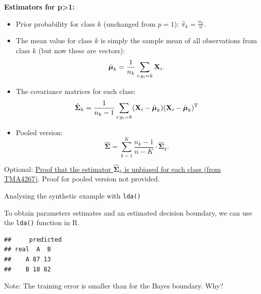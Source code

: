 \documentclass[10pt,ignorenonframetext,]{beamer}
\newenvironment{Shaded}{\begin{snugshade}}{\end{snugshade}}
\newcommand{\KeywordTok}[1]{\textcolor[rgb]{0.13,0.29,0.53}{\textbf{#1}}}
\newcommand{\DataTypeTok}[1]{\textcolor[rgb]{0.13,0.29,0.53}{#1}}
\newcommand{\StringTok}[1]{\textcolor[rgb]{0.31,0.60,0.02}{#1}}
\newcommand{\OperatorTok}[1]{\textcolor[rgb]{0.81,0.36,0.00}{\textbf{#1}}}
\newcommand{\NormalTok}[1]{#1}
\begin{document}
\begin{frame}

\textbf{Estimators for p\textgreater{}1:}

\begin{itemize}
\item
  Prior probability for class \(k\) (unchanged from \(p=1\)):
  \(\hat{\pi}_k = \frac{n_k}{n}.\)
\item
  The mean value for class \(k\) is simply the sample mean of all
  observations from class \(k\) (but now these are vectors):
  \[\hat{\boldsymbol{\mu}}_k = \frac{1}{n_k}\sum_{i:y_i=k} {\bf X}_i.\]
\item
  The covariance matrices for each class:
  \[\hat{\boldsymbol{\Sigma}}_k=\frac{1}{n_k-1}\sum_{i:y_i=k} ({\bf X}_i-\hat{\boldsymbol{\mu}}_k ) ({\bf X}_i-\hat{\boldsymbol{\mu}}_k)^T\]
\item
  Pooled version:
  \[\hat{\boldsymbol{\Sigma}}= \sum_{k=1}^K \frac{n_k - 1}{n - K} \cdot \hat{\boldsymbol{\Sigma}}_k.\]
\end{itemize}

Optional:
\href{https://www.math.ntnu.no/emner/TMA4268/2018v/notes/ProofMeanS.pdf}{Proof
that the estimator \(\hat{\boldsymbol{\Sigma}}_k\) is unbiased for each
class (from TMA4267)}. Proof for pooled version not provided.

\end{frame}

\begin{frame}[fragile]

\begin{block}{Analysing the synthetic example with \texttt{lda()}}

\vspace{2mm}

To obtain parameters estimates and an estimated decision boundary, we
can use the \texttt{lda()} function in R.

\scriptsize

\begin{Shaded}
\end{Shaded}

\begin{verbatim}
##     predicted
## real  A  B
##    A 87 13
##    B 18 82
\end{verbatim}

\normalsize
Note: The training error is smaller than for the Bayes boundary. Why?

\end{block}

\end{frame}
\end{document}
